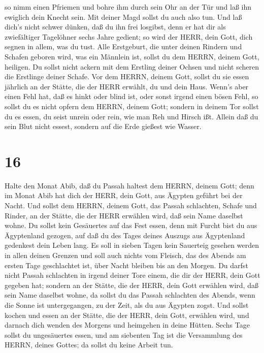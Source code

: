  so nimm einen Pfriemen und bohre ihm durch sein Ohr an der
Tür und laß ihn ewiglich dein Knecht sein. Mit deiner Magd sollst du
auch also tun.  Und laß dich's nicht schwer dünken, daß du
ihn frei losgibst, denn er hat dir als zwiefältiger Tagelöhner sechs
Jahre gedient; so wird der HERR, dein Gott, dich segnen in allem, was du
tust.  Alle Erstgeburt, die unter deinen Rindern und
Schafen geboren wird, was ein Männlein ist, sollst du dem HERRN, deinem
Gott, heiligen. Du sollst nicht ackern mit dem Erstling deiner Ochsen
und nicht scheren die Erstlinge deiner Schafe.  Vor dem
HERRN, deinem Gott, sollst du sie essen jährlich an der Stätte, die der
HERR erwählt, du und dein Haus.  Wenn's aber einen Fehl
hat, daß es hinkt oder blind ist, oder sonst irgend einen bösen Fehl, so
sollst du es nicht opfern dem HERRN, deinem Gott;  sondern
in deinem Tor sollst du es essen, du seist unrein oder rein, wie man Reh
und Hirsch ißt.  Allein daß du sein Blut nicht essest,
sondern auf die Erde gießest wie Wasser.

\hypertarget{section-15}{%
\section{16}\label{section-15}}

 Halte den Monat Abib, daß du Passah haltest dem HERRN,
deinem Gott; denn im Monat Abib hat dich der HERR, dein Gott, aus
Ägypten geführt bei der Nacht.  Und sollst dem HERRN, deinem
Gott, das Passah schlachten, Schafe und Rinder, an der Stätte, die der
HERR erwählen wird, daß sein Name daselbst wohne.  Du sollst
kein Gesäuertes auf das Fest essen, denn mit Furcht bist du aus
Ägyptenland gezogen, auf daß du des Tages deines Auszugs aus Ägyptenland
gedenkest dein Leben lang.  Es soll in sieben Tagen kein
Sauerteig gesehen werden in allen deinen Grenzen und soll auch nichts
vom Fleisch, das des Abends am ersten Tage geschlachtet ist, über Nacht
bleiben bis an den Morgen.  Du darfst nicht Passah
schlachten in irgend deiner Tore einem, die dir der HERR, dein Gott
gegeben hat;  sondern an der Stätte, die der HERR, dein Gott
erwählen wird, daß sein Name daselbst wohne, da sollst du das Passah
schlachten des Abends, wenn die Sonne ist untergegangen, zu der Zeit,
als du aus Ägypten zogst.  Und sollst kochen und essen an
der Stätte, die der HERR, dein Gott, erwählen wird, und darnach dich
wenden des Morgens und heimgehen in deine Hütten.  Sechs
Tage sollst du ungesäuertes essen, und am siebenten Tag ist die
Versammlung des HERRN, deines Gottes; da sollst du keine Arbeit tun.

